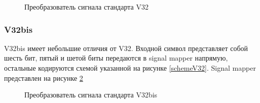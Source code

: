 \documentclass[a4paper,12pt]{article}
\begin{document}
\begin{figure}
	\caption{Преобразователь сигнала стандарта V32}
	\label{mapperV32}
\end{figure}

\subsubsection{V32bis}
V32bis имеет небольшие отличия от V32. Входной символ представляет собой шесть бит, пятый и шетой биты передаются в 
signal mapper напрямую, остальные кодируются схемой указанной на рисунке \ref{schemeV32}. Signal mapper представлен
на рисунке \ref{mapperV32bis}

\begin{figure}
	\caption{Преобразователь сигнала стандарта V32bis}
	\label{mapperV32bis}
\end{figure}
\end{document}
